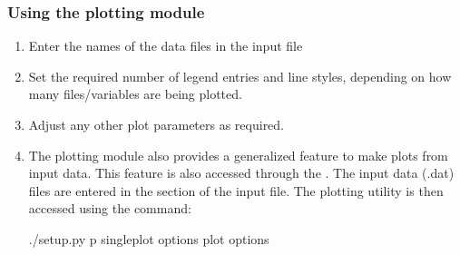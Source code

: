 \documentclass[letterpaper,10pt,english]{sphinxmanual}
\begin{document}
\subsubsection{Using the plotting module}
\label{\detokenize{gridpyfiles/plot:using-the-plotting-module}}\begin{enumerate}
\item {} 
Enter the names of the data files in the input file

\item {} 
Set the required number of legend entries and line styles, depending on  how many files/variables are being plotted.

\item {} 
Adjust any other plot parameters as required.

\item {} 
The plotting module also provides a generalized feature to make plots from input data. This feature is also accessed through the . The input data (.dat) files are entered in the  section of the input file. The plotting utility is then accessed using the command:

\begin{sphinxVerbatim}[commandchars=\\\{\}]
\PYGZdl{} ./setup.py \PYGZhy{}p single\PYGZus{}plot options \PYGZdq{}\PYGZob{}\PYGZlt{}plot options\PYGZgt{}\PYGZcb{}\PYGZdq{}
\end{sphinxVerbatim}

\end{enumerate}
\end{document}
